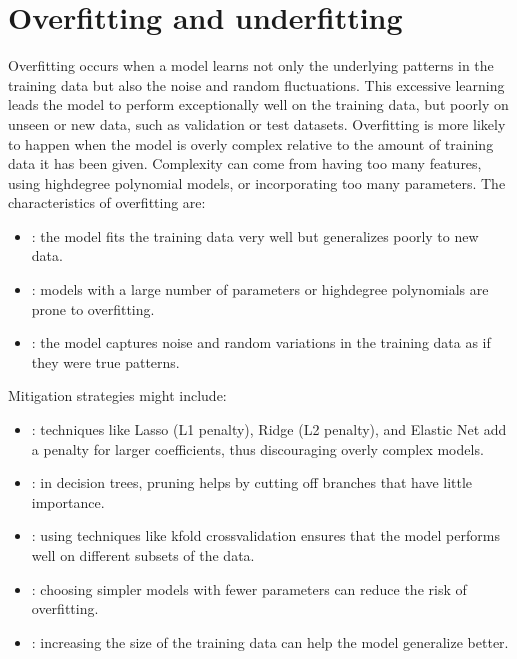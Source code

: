 \documentclass[letterpaper,10pt,english]{jupyterBook}
\begin{document}
\section{Overfitting and underfitting}
\label{\detokenize{notebooks/review_ML:overfitting-and-underfitting}}
\sphinxAtStartPar
Overfitting occurs when a model learns not only the underlying patterns in the training data but also the noise and random fluctuations. This excessive learning leads the model to perform exceptionally well on the training data, but poorly on unseen or new data, such as validation or test datasets. Overfitting is more likely to happen when the model is overly complex relative to the amount of training data it has been given. Complexity can come from having too many features, using high\sphinxhyphen{}degree polynomial models, or incorporating too many parameters. The characteristics of overfitting are:
\begin{itemize}
\item {} 
\sphinxAtStartPar
{}: the model fits the training data very well but generalizes poorly to new data.

\item {} 
\sphinxAtStartPar
{}: models with a large number of parameters or high\sphinxhyphen{}degree polynomials are prone to overfitting.

\item {} 
\sphinxAtStartPar
{}: the model captures noise and random variations in the training data as if they were true patterns.

\end{itemize}

\sphinxAtStartPar
Mitigation strategies might include:
\begin{itemize}
\item {} 
\sphinxAtStartPar
{}: techniques like Lasso (L1 penalty), Ridge (L2 penalty), and Elastic Net add a penalty for larger coefficients, thus discouraging overly complex models.

\item {} 
\sphinxAtStartPar
{}: in decision trees, pruning helps by cutting off branches that have little importance.

\item {} 
\sphinxAtStartPar
{}: using techniques like k\sphinxhyphen{}fold cross\sphinxhyphen{}validation ensures that the model performs well on different subsets of the data.

\item {} 
\sphinxAtStartPar
{}: choosing simpler models with fewer parameters can reduce the risk of overfitting.

\item {} 
\sphinxAtStartPar
{}: increasing the size of the training data can help the model generalize better.

\end{itemize}
\end{document}
